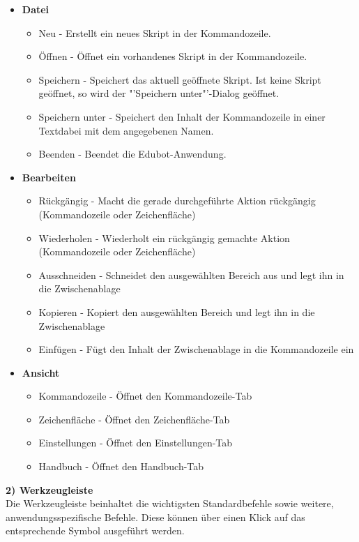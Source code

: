 \begin{itemize}
\item \textbf{Datei}
\begin{itemize}
\item Neu - Erstellt ein neues Skript in der Kommandozeile.
\item Öffnen - Öffnet ein vorhandenes Skript in der Kommandozeile.
\item Speichern - Speichert das aktuell geöffnete Skript. Ist keine Skript geöffnet, so wird der "'Speichern unter"'-Dialog geöffnet.
\item Speichern unter - Speichert den Inhalt der Kommandozeile in einer Textdabei mit dem angegebenen Namen.
\item Beenden - Beendet die Edubot-Anwendung.
\end{itemize}
\item \textbf{Bearbeiten}
\begin{itemize}
\item Rückgängig - Macht die gerade durchgeführte Aktion rückgängig (Kommandozeile oder Zeichenfläche)
\item Wiederholen - Wiederholt ein rückgängig gemachte Aktion (Kommandozeile oder Zeichenfläche)
\item Ausschneiden - Schneidet den ausgewählten Bereich aus und legt ihn in die Zwischenablage 
\item Kopieren - Kopiert den ausgewählten Bereich und legt ihn in die Zwischenablage
\item Einfügen - Fügt den Inhalt der Zwischenablage in die Kommandozeile ein
\end{itemize}
\item \textbf{Ansicht}
\begin{itemize}
\item Kommandozeile - Öffnet den Kommandozeile-Tab
\item Zeichenfläche - Öffnet den Zeichenfläche-Tab
\item Einstellungen - Öffnet den Einstellungen-Tab
\item Handbuch - Öffnet den Handbuch-Tab
\end{itemize}
\end{itemize}
\textbf{2) Werkzeugleiste}\\
Die Werkzeugleiste beinhaltet die wichtigsten Standardbefehle sowie weitere, anwendungsspezifische Befehle. Diese können über einen Klick auf das entsprechende Symbol ausgeführt werden.
